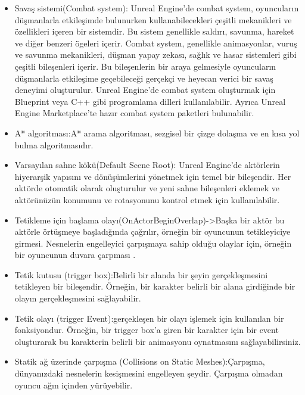 \documentclass[12pt,a4paper]{article}
\begin{document}
\begin{itemize}
		 	 \item Savaş sistemi(Combat system):
		 	 Unreal Engine'de combat system, oyuncuların düşmanlarla etkileşimde bulunurken kullanabilecekleri çeşitli mekanikleri ve özellikleri içeren bir sistemdir. Bu sistem genellikle saldırı, savunma, hareket ve diğer benzeri ögeleri içerir.
		 	  Combat system, genellikle animasyonlar, vuruş ve savunma mekanikleri, düşman yapay zekası, sağlık ve hasar sistemleri gibi çeşitli bileşenleri içerir. Bu bileşenlerin bir araya gelmesiyle oyuncuların düşmanlarla etkileşime geçebileceği gerçekçi ve heyecan verici bir savaş deneyimi oluşturulur.
		 	 Unreal Engine'de combat system oluşturmak için Blueprint veya C++ gibi programlama dilleri kullanılabilir. Ayrıca Unreal Engine Marketplace'te hazır combat system paketleri bulunabilir.
		 	 \item A* algoritması:A* arama algoritması, sezgisel bir çizge dolaşma ve en kısa yol bulma algoritmasıdır\cite{astar}.
		 	 \item Varsayılan sahne kökü(Default Scene Root): Unreal Engine'de aktörlerin hiyerarşik yapısını ve dönüşümlerini yönetmek için temel bir bileşendir. Her aktörde otomatik olarak oluşturulur ve yeni sahne bileşenleri eklemek ve aktörünüzün konumunu ve rotasyonunu kontrol etmek için kullanılabilir. 
		 	 \item  Tetikleme için başlama olayı(OnActorBeginOverlap)->Başka bir aktör bu aktörle örtüşmeye başladığında çağrılır, örneğin bir oyuncunun tetikleyiciye girmesi. Nesnelerin engelleyici çarpışmaya sahip olduğu olaylar için, örneğin bir oyuncunun duvara çarpması \cite{overlap}.
		 	 \item Tetik kutusu (trigger box):Belirli bir alanda bir şeyin gerçekleşmesini tetikleyen bir bileşendir. Örneğin, bir karakter belirli bir alana girdiğinde bir olayın gerçekleşmesini sağlayabilir.
		 	 \item  Tetik olayı (trigger Event):gerçekleşen bir olayı işlemek için kullanılan bir fonksiyondur. Örneğin, bir trigger box'a giren bir karakter için bir event oluşturarak bu karakterin belirli bir animasyonu oynatmasını sağlayabilirsiniz.
		 	
		 	 \item Statik ağ üzerinde çarpışma (Collisions on Static Meshes):Çarpışma, dünyanızdaki nesnelerin kesişmesini engelleyen şeydir. Çarpışma olmadan oyuncu ağın içinden yürüyebilir\cite{collision}.
		 	 
		 	 \begin{center}
		 	 	\begin{figure}[htbp!]
		 	 		\centering				
		 	 		\begin{subfigure}[t]{0.7\textwidth}
		 	 			

\end{subfigure}
\end{figure}
\end{center}
\end{itemize}
\end{document}
